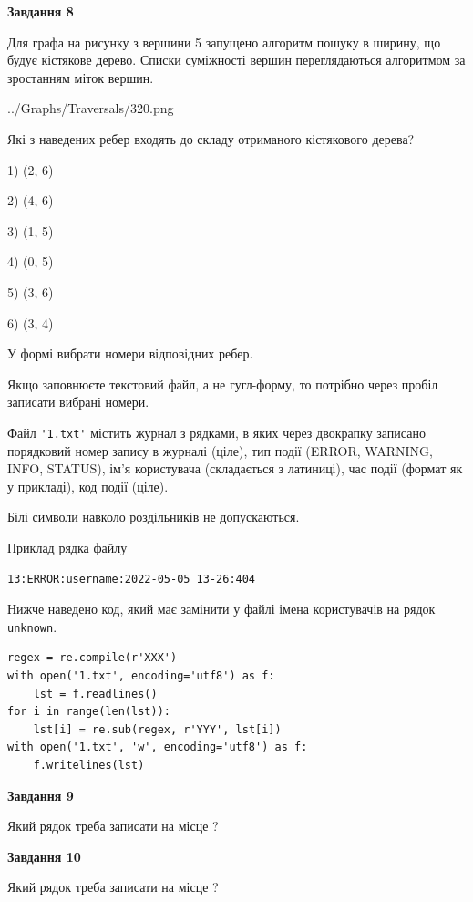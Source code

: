 \documentclass[12pt, ukrainian]{article}
\def\code#1{\Verb!#1!}
\begin{document}
{\begin {large}
{\begin {center}\textbf{Завдання 8}\end {center}}\par
Для графа на рисунку з вершини 5 запущено алгоритм пошуку в ширину, що будує кістякове дерево. Списки суміжності вершин переглядаються алгоритмом за зростанням міток вершин.\par
\begin{center}
	{../Graphs/Traversals/320.png}
\end{center}
\par Які з наведених ребер входять до складу отриманого кістякового дерева?\par
1) (2, 6)\par
2) (4, 6)\par
3) (1, 5)\par
4) (0, 5)\par
5) (3, 6)\par
6) (3, 4)\par
{\vskip 15pt} У формі вибрати номери відповідних ребер.


Якщо заповнюєте текстовий файл, а не гугл-форму, то потрібно через пробіл записа\-ти вибрані номери.\par
\newpage


Файл \code{'1.txt'} містить журнал з рядками, в яких через двокрапку записано поряд\-ко\-вий номер запису в журналі (ціле), тип події (ERROR, WARNING, INFO, STATUS), ім'я користувача (складається з латиниці), час події (фор\-мат як у прикладі), код події (ціле).

Білі символи навколо роздільників не допускаються.

Приклад рядка файлу



\begin{verbatim}
13:ERROR:username:2022-05-05 13-26:404
\end{verbatim}


Нижче наведено код, який має замінити у файлі імена користувачів на рядок \code{unknown}.



\begin{verbatim}
regex = re.compile(r'XXX')
with open('1.txt', encoding='utf8') as f:
    lst = f.readlines()
for i in range(len(lst)):
    lst[i] = re.sub(regex, r'YYY', lst[i])
with open('1.txt', 'w', encoding='utf8') as f:
    f.writelines(lst)
\end{verbatim}




{\begin {center}\textbf{Завдання 9}\end {center}}\par
Який рядок треба записати на місце  ?\par
\vspace{5mm}


{\begin {center}\textbf{Завдання 10}\end {center}}\par
Який рядок треба записати на місце  ?\par


\newpage


\end {large}}
\end{document}
